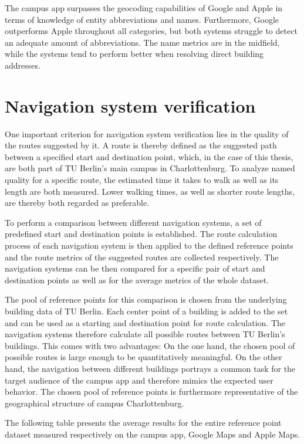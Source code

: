 The campus app surpasses the geocoding capabilities of Google and Apple in terms of knowledge of entity abbreviations and names. Furthermore, Google outperforms Apple throughout all categories, but both systems struggle to detect an adequate amount of abbreviations. The name metrics are in the midfield, while the systems tend to perform better when resolving direct building addresses.

\section{Navigation system verification} \label{sec:navigation_system_verification}
One important criterion for navigation system verification lies in the quality of the routes suggested by it. A route is thereby defined as the suggested path between a specified start and destination point, which, in the case of this thesis, are both part of TU Berlin's main campus in Charlottenburg. To analyze named quality for a specific route, the estimated time it takes to walk as well as its length are both measured. Lower walking times, as well as shorter route lengths, are thereby both regarded as preferable.

To perform a comparison between different navigation systems, a set of predefined start and destination points is established. The route calculation process of each navigation system is then applied to the defined reference points and the route metrics of the suggested routes are collected respectively. The navigation systems can be then compared for a specific pair of start and destination points as well as for the average metrics of the whole dataset. 

The pool of reference points for this comparison is chosen from the underlying building data of TU Berlin. Each center point of a building is added to the set and can be used as a starting and destination point for route calculation. The navigation systems therefore calculate all possible routes between TU Berlin's buildings. This comes with two advantages: On the one hand, the chosen pool of possible routes is large enough to be quantitatively meaningful. On the other hand, the navigation between different buildings portrays a common task for the target audience of the campus app and therefore mimics the expected user behavior. The chosen pool of reference points is furthermore representative of the geographical structure of campus Charlottenburg.

The following table presents the average results for the entire reference point dataset measured respectively on the campus app, Google Maps and Apple Maps.

